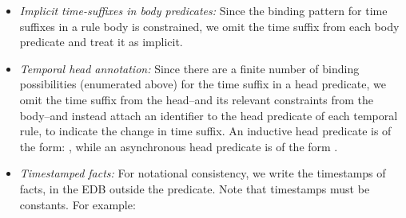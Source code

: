 \begin{itemize}
%
%
\item {\em Implicit time-suffixes in body predicates:} Since the binding
pattern for time suffixes in a rule body is constrained, we omit the time
suffix from each body predicate and treat it as implicit.

\item {\em Temporal head annotation:} Since there are a finite number of
binding possibilities (enumerated above) for the time suffix in a head
predicate, we omit the time suffix from the head--and its relevant constraints
from the body--and instead attach an identifier to the head predicate of each
temporal rule, to indicate the change in time suffix.  An inductive head
predicate  is of the form: , while
an asynchronous head predicate  is of the form
.

\item {\em Timestamped facts:} For notational consistency, we write the
timestamps of facts, in the EDB outside the
predicate.  Note that timestamps must be constants.  For example:


%
%
%
%
%
\end{itemize}


